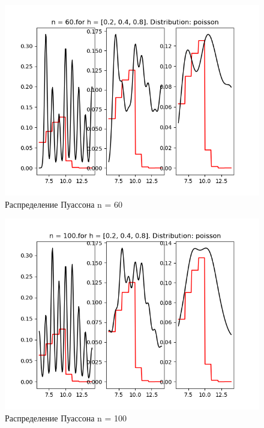 \documentclass[a4]{article}
\begin{document}
\begin{center}
\begin{figure}[h!]
			\includegraphics[width=\textwidth]{poissonker60.png}
			\caption[Распределение Пуассона n = 60]{Распределение Пуассона n = 60}
		\end{figure}
		\newpage
		\begin{figure}[h!]
			\includegraphics[width=\textwidth]{poissonker100.png}
			\caption[Распределение Пуассона n = 100]{Распределение Пуассона n = 100}
		\end{figure}
		\newpage
		\begin{figure}[h!]

\end{figure}
\end{center}
\end{document}
